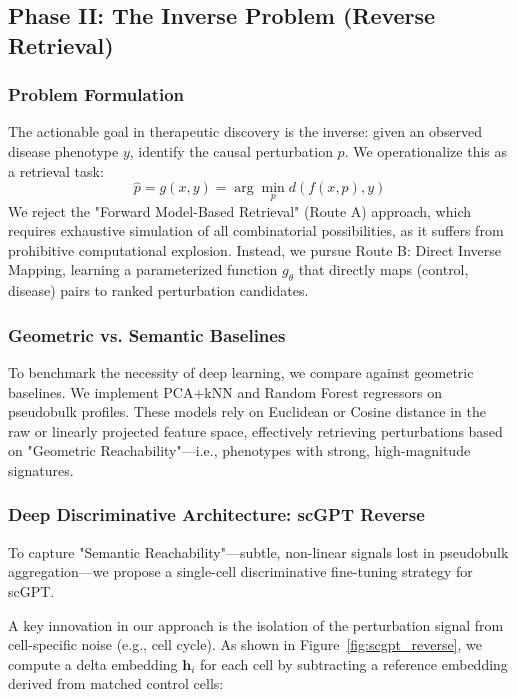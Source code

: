 \documentclass[conference]{IEEEtran}
\begin{document}
\subsection{Phase II: The Inverse Problem (Reverse Retrieval)}

\subsubsection{Problem Formulation}
The actionable goal in therapeutic discovery is the inverse: given an observed disease phenotype $y$, identify the causal perturbation $p$. We operationalize this as a retrieval task:
\[
\hat{p} = g(x, y) = \arg\min_{p} d(f(x, p), y)
\]
We reject the "Forward Model-Based Retrieval" (Route A) approach, which requires exhaustive simulation of all combinatorial possibilities, as it suffers from prohibitive computational explosion. Instead, we pursue Route B: Direct Inverse Mapping, learning a parameterized function $g_\theta$ that directly maps (control, disease) pairs to ranked perturbation candidates.

\subsubsection{Geometric vs. Semantic Baselines}
To benchmark the necessity of deep learning, we compare against geometric baselines. We implement PCA+kNN and Random Forest regressors on pseudobulk profiles. These models rely on Euclidean or Cosine distance in the raw or linearly projected feature space, effectively retrieving perturbations based on "Geometric Reachability"—i.e., phenotypes with strong, high-magnitude signatures.

\subsubsection{Deep Discriminative Architecture: scGPT Reverse}
To capture "Semantic Reachability"—subtle, non-linear signals lost in pseudobulk aggregation—we propose a single-cell discriminative fine-tuning strategy for scGPT.

A key innovation in our approach is the isolation of the perturbation signal from cell-specific noise (e.g., cell cycle).
As shown in Figure~\ref{fig:scgpt_reverse}, we compute a delta embedding $\mathbf{h}_i$ for each cell by subtracting a reference embedding derived from matched control cells:
\end{document}
